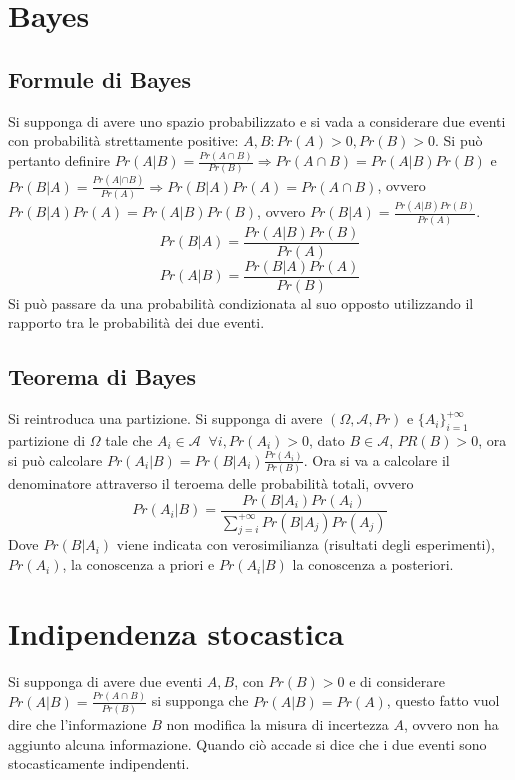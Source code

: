 \chapter{Bayes}
\section{Formule di Bayes}
Si supponga di avere uno spazio probabilizzato e si vada a considerare due eventi con probabilit\`a strettamente positive: $A,B: Pr(A)>0, Pr(B)>0$. Si pu\`o pertanto definire
$Pr(A|B)=\frac{Pr(A\cap B)}{Pr(B)}\Rightarrow Pr(A\cap B)=Pr(A|B)Pr(B)$ e $Pr(B|A)=\frac{Pr(A|\cap B)}{Pr(A)}\Rightarrow Pr(B|A)Pr(A)=Pr(A\cap B)$, ovvero $Pr(B|A)Pr(A)=Pr(A|B)Pr(B)$, ovvero $Pr(B|A)=\frac{Pr(A|B)Pr(B)}{Pr(A)}$.
\begin{equation}
Pr(B|A)=\dfrac{Pr(A|B)Pr(B)}{Pr(A)}
\end{equation}
\begin{equation}
Pr(A|B)=\dfrac{Pr(B|A)Pr(A)}{Pr(B)}
\end{equation}
Si pu\`o passare da una probabilit\`a condizionata al suo opposto utilizzando il rapporto tra le probabilit\`a dei due eventi.
\section{Teorema di Bayes}
Si reintroduca una partizione. Si supponga di avere $(\Omega,\mathcal{A},Pr)$ e $\{A_i\}_{i=1}^{+\infty}$ partizione di $\Omega$ tale che $A_i\in\mathcal{A}\;\;\forall 
i,Pr(A_i)>0$, dato $B\in\mathcal{A}$, $PR(B)>0$, ora si pu\`o calcolare $Pr(A_i|B)=Pr(B|A_i)\frac{Pr(A_i)}{Pr(B)}$. Ora si va a calcolare il denominatore attraverso il teroema 
delle probabilit\`a totali, ovvero 
\begin{equation}
Pr(A_i|B)=\dfrac{Pr(B|A_i)Pr(A_i)}{\sum\limits_{j=i}^{+\infty}Pr(B|A_j)Pr(A_j)}
\end{equation}
Dove $Pr(B|A_i)$ viene indicata con verosimilianza (risultati degli esperimenti), $Pr(A_i)$, la conoscenza a priori e $Pr(A_i|B)$ la conoscenza a posteriori. 
\chapter{Indipendenza stocastica}
Si supponga di avere due eventi $A, B$, con $Pr(B)>0$ e di considerare $Pr(A|B)=\frac{Pr(A\cap B)}{Pr(B)}$ si supponga che $Pr(A|B)=Pr(A)$, questo fatto vuol dire che 
l'informazione $B$ non modifica la misura di incertezza $A$, ovvero non ha aggiunto alcuna informazione. Quando ci\`o accade si dice che i due eventi sono stocasticamente 
indipendenti. 
